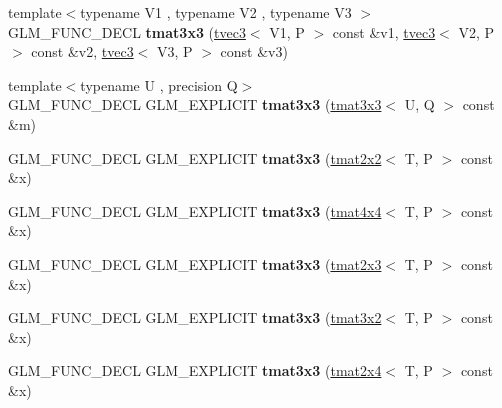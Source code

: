 \begin{DoxyCompactItemize}
\item 
\mbox{\label{structglm_1_1tmat3x3_aa124ab387668b4444834f36fb7b02a9d}} 
{\footnotesize template$<$typename V1 , typename V2 , typename V3 $>$ }\\G\+L\+M\+\_\+\+F\+U\+N\+C\+\_\+\+D\+E\+CL {\bfseries tmat3x3} (\hyperlink{structglm_1_1tvec3}{tvec3}$<$ V1, P $>$ const \&v1, \hyperlink{structglm_1_1tvec3}{tvec3}$<$ V2, P $>$ const \&v2, \hyperlink{structglm_1_1tvec3}{tvec3}$<$ V3, P $>$ const \&v3)
\item 
\mbox{\label{structglm_1_1tmat3x3_a7c44285c419a7485e7e558ee66c2a147}} 
{\footnotesize template$<$typename U , precision Q$>$ }\\G\+L\+M\+\_\+\+F\+U\+N\+C\+\_\+\+D\+E\+CL G\+L\+M\+\_\+\+E\+X\+P\+L\+I\+C\+IT {\bfseries tmat3x3} (\hyperlink{structglm_1_1tmat3x3}{tmat3x3}$<$ U, Q $>$ const \&m)
\item 
\mbox{\label{structglm_1_1tmat3x3_ae07ead4a125f21a8be9c423c09434f93}} 
G\+L\+M\+\_\+\+F\+U\+N\+C\+\_\+\+D\+E\+CL G\+L\+M\+\_\+\+E\+X\+P\+L\+I\+C\+IT {\bfseries tmat3x3} (\hyperlink{structglm_1_1tmat2x2}{tmat2x2}$<$ T, P $>$ const \&x)
\item 
\mbox{\label{structglm_1_1tmat3x3_a802f89baac6ac79fe657088c95308c7b}} 
G\+L\+M\+\_\+\+F\+U\+N\+C\+\_\+\+D\+E\+CL G\+L\+M\+\_\+\+E\+X\+P\+L\+I\+C\+IT {\bfseries tmat3x3} (\hyperlink{structglm_1_1tmat4x4}{tmat4x4}$<$ T, P $>$ const \&x)
\item 
\mbox{\label{structglm_1_1tmat3x3_aedf6749905c8adde35f51c14c50197db}} 
G\+L\+M\+\_\+\+F\+U\+N\+C\+\_\+\+D\+E\+CL G\+L\+M\+\_\+\+E\+X\+P\+L\+I\+C\+IT {\bfseries tmat3x3} (\hyperlink{structglm_1_1tmat2x3}{tmat2x3}$<$ T, P $>$ const \&x)
\item 
\mbox{\label{structglm_1_1tmat3x3_a69d122cdc832030b626f7a34524216b0}} 
G\+L\+M\+\_\+\+F\+U\+N\+C\+\_\+\+D\+E\+CL G\+L\+M\+\_\+\+E\+X\+P\+L\+I\+C\+IT {\bfseries tmat3x3} (\hyperlink{structglm_1_1tmat3x2}{tmat3x2}$<$ T, P $>$ const \&x)
\item 
\mbox{\label{structglm_1_1tmat3x3_a945eb750045d533d8d9a56eb76011cfe}} 
G\+L\+M\+\_\+\+F\+U\+N\+C\+\_\+\+D\+E\+CL G\+L\+M\+\_\+\+E\+X\+P\+L\+I\+C\+IT {\bfseries tmat3x3} (\hyperlink{structglm_1_1tmat2x4}{tmat2x4}$<$ T, P $>$ const \&x)

\end{DoxyCompactItemize}
